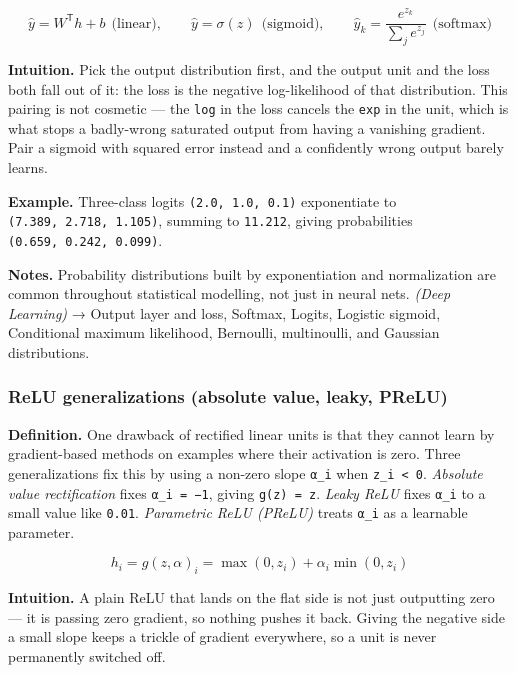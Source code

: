 \documentclass[
  10pt,
  letterpaper,
  onecolumn]{article}
\begin{document}
\begin{equation*}
\hat y=W^{\mathsf T}h+b\ \ \text{(linear)},
\qquad
\hat y=\sigma(z)\ \ \text{(sigmoid)},
\qquad
\hat y_k=\frac{e^{z_k}}{\sum_j e^{z_j}}\ \ \text{(softmax)}
\end{equation*}

\textbf{Intuition.} Pick the output distribution first, and the output
unit and the loss both fall out of it: the loss is the negative
log-likelihood of that distribution. This pairing is not cosmetic ---
the \texttt{log} in the loss cancels the \texttt{exp} in the unit, which
is what stops a badly-wrong saturated output from having a vanishing
gradient. Pair a sigmoid with squared error instead and a confidently
wrong output barely learns.

\textbf{Example.} Three-class logits \texttt{(2.0,\ 1.0,\ 0.1)}
exponentiate to \texttt{(7.389,\ 2.718,\ 1.105)}, summing to
\texttt{11.212}, giving probabilities
\texttt{(0.659,\ 0.242,\ 0.099)}.

\textbf{Notes.} Probability distributions built by exponentiation and
normalization are common throughout statistical modelling, not just in
neural nets. \emph{(Deep Learning)} → Output layer and loss, Softmax,
Logits, Logistic sigmoid, Conditional maximum likelihood, Bernoulli,
multinoulli, and Gaussian distributions.

\hypertarget{relu-generalizations-absolute-value-leaky-prelu}{%
\subsubsection{ReLU generalizations (absolute value, leaky,
PReLU)}\label{relu-generalizations-absolute-value-leaky-prelu}}

\textbf{Definition.} One drawback of rectified linear units is that they
cannot learn by gradient-based methods on examples where their
activation is zero. Three generalizations fix this by using a non-zero
slope \texttt{α\_i} when \texttt{z\_i\ \textless{}\ 0}.
\emph{Absolute value rectification} fixes \texttt{α\_i\ =\ −1}, giving
\texttt{g(z)\ =\ \textbar{}z\textbar{}}. \emph{Leaky ReLU} fixes
\texttt{α\_i} to a small value like \texttt{0.01}. \emph{Parametric ReLU
(PReLU)} treats \texttt{α\_i} as a learnable parameter.

\begin{equation*}
h_i=g(z,\alpha)_i=\max(0,z_i)+\alpha_i\min(0,z_i)
\end{equation*}

\textbf{Intuition.} A plain ReLU that lands on the flat side is not just
outputting zero --- it is passing zero gradient, so nothing pushes it
back. Giving the negative side a small slope keeps a trickle of gradient
everywhere, so a unit is never permanently switched off.
\end{document}

